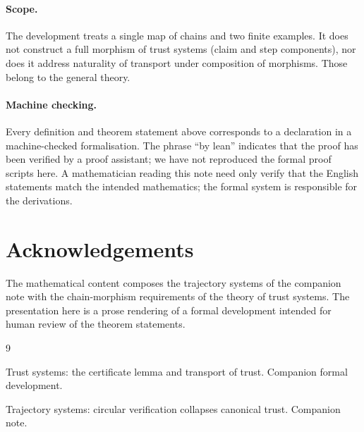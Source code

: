 \documentclass[11pt,a4paper]{article}
\theoremstyle{plain}
\theoremstyle{definition}
\begin{document}
\paragraph{Scope.}
The development treats a single map of chains and two finite examples. It
does not construct a full morphism of trust systems (claim and step
components), nor does it address naturality of transport under composition
of morphisms. Those belong to the general theory.

\paragraph{Machine checking.}
Every definition and theorem statement above corresponds to a declaration in
a machine-checked formalisation. The phrase ``by lean'' indicates that the
proof has been verified by a proof assistant; we have not reproduced the
formal proof scripts here. A mathematician reading this note need only
verify that the English statements match the intended mathematics; the
formal system is responsible for the derivations.

\section*{Acknowledgements}

The mathematical content composes the trajectory systems of the companion
note with the chain-morphism requirements of the theory of trust systems.
The presentation here is a prose rendering of a formal development intended
for human review of the theorem statements.

\begin{thebibliography}{9}

Trust systems: the certificate lemma and transport of trust.
\newblock Companion formal development.

Trajectory systems: circular verification collapses canonical trust.
\newblock Companion note.

\end{thebibliography}
\end{document}
